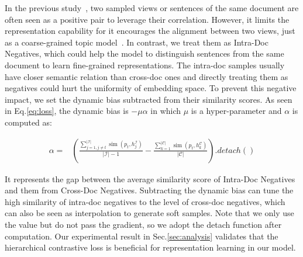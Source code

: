 \documentclass{article} %
\begin{document}

In the previous study~\citep{gao2021cocondenser}, two sampled views or sentences of the same document are often seen as a positive pair to leverage their correlation. However, it limits the representation capability for it encourages the alignment between two views, just as a coarse-grained topic model~\citep{yan2013biterm}. In contrast, we treat them as Intra-Doc Negatives, which could help the model to distinguish sentences from the same document to learn fine-grained representations. The intra-doc samples usually have closer semantic relation than cross-doc ones and directly treating them as negatives could hurt the uniformity of embedding space. To prevent this negative impact, we set the dynamic bias subtracted from their similarity scores. As seen in Eq.\ref{eq:loss}, the dynamic bias is $-{\mu}{\alpha}$ in which $\mu$ is a hyper-parameter and $\alpha$ is computed as:


\begin{small} 
\begin{equation}
\label{eq:bias}
\begin{aligned}
     {\alpha} = & \left(\frac{\sum_{j=1, j{\neq}t}^{|\mathcal{I}|} \operatorname{sim}\left(p_{t}, h^{\mathcal{I}}_j\right)} {|\mathcal{I}| - 1} 
     - \frac{\sum_{k=1}^{|\mathcal{C}|} \operatorname{sim}\left(p_{t}, h^{\mathcal{C}}_k\right)}{|\mathcal{C}|} \right).detach()
\end{aligned}
\end{equation}
\end{small}


\noindent It represents the gap between the average similarity score of Intra-Doc Negatives and them from Cross-Doc Negatives. Subtracting the dynamic bias can tune the high similarity of intra-doc negatives to the level of cross-doc negatives, which can also be seen as interpolation to generate soft samples. Note that we only use the value but do not pass the gradient, so we adopt the detach function after computation. Our experimental result in Sec.\ref{sec:analysis} validates that the hierarchical contrastive loss is beneficial for representation learning in our model.


\end{document}
